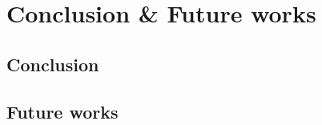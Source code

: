 
\chapter{Conclusion \& Future works}
\label{chap:conclusion}

\section{Conclusion}


\section{Future works}
